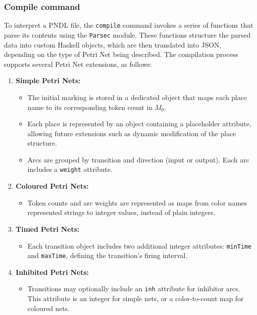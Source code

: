 \documentclass[12pt]{article}
\begin{document}
        \subsubsection{Compile command}
        To interpret a PNDL file, the \texttt{compile} command invokes a series of functions that parse its contents using the \texttt{Parsec} module. These functions structure the parsed data into custom Haskell objects, which are then translated into JSON, depending on the type of Petri Net being described. The compilation process supports several Petri Net extensions, as follows:

        \begin{enumerate}
            \item \textbf{Simple Petri Nets:}
            \begin{itemize}
                \item The initial marking is stored in a dedicated object that maps each place name to its corresponding token count in $M_0$.
                \item Each place is represented by an object containing a placeholder attribute, allowing future extensions such as dynamic modification of the place structure.
                \item Arcs are grouped by transition and direction (input or output). Each arc includes a \texttt{weight} attribute.
            \end{itemize}
        
            \item \textbf{Coloured Petri Nets:}
            \begin{itemize}
                \item Token counts and arc weights are represented as maps from color names represented strings to integer values, instead of plain integers.
            \end{itemize}
        
            \item \textbf{Timed Petri Nets:}
            \begin{itemize}
                \item Each transition object includes two additional integer attributes: \texttt{minTime} and \texttt{maxTime}, defining the transition's firing interval.
            \end{itemize}
        
            \item \textbf{Inhibited Petri Nets:}
            \begin{itemize}
                \item Transitions may optionally include an \texttt{inh} attribute for inhibitor arcs. This attribute is an integer for simple nets, or a color-to-count map for coloured nets.
            \end{itemize}
        

\end{enumerate}
\end{document}

